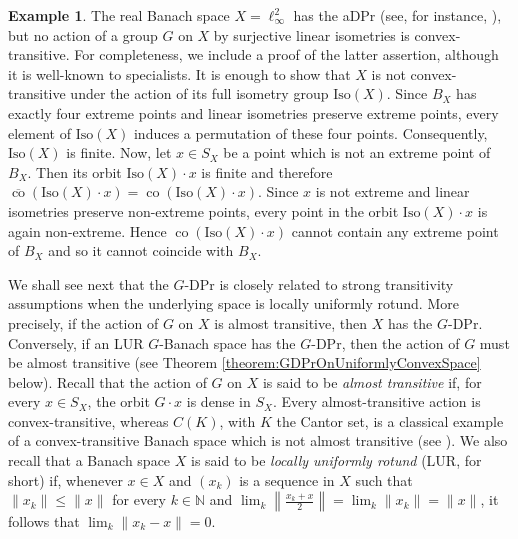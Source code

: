 \documentclass[a4paper,12pt]{amsart}
\theoremstyle{definition}
\theoremstyle{definition}
\newtheorem{example}[theorem]{Example}
\theoremstyle{remark}
\numberwithin{equation}{section}
\newcommand{\N}{\mathbb{N}}
\newcommand{\Iso}{\mathrm{Iso}}
\DeclareMathOperator{\co}{co}
\renewcommand{\leq}{\leqslant}
\newcommand{\<}{\langle}
\renewcommand{\>}{\rangle}
\begin{document}
	
	\begin{example} The real Banach space $X=\ell_\infty^2$ has the aDPr (see, for instance, \cite[Proposition 1.4.8]{KMRW}), but no action of a group $G$ on $X$ by surjective linear isometries is convex-transitive. For completeness, we include a proof of the latter assertion, although it is well-known to specialists. It is enough to show that $X$ is not convex-transitive under the action of its full isometry group $\Iso(X)$. Since $B_X$ has exactly four extreme points and linear isometries preserve extreme points, every element of $\Iso(X)$ induces a permutation of these four points. Consequently, $\Iso(X)$ is finite. Now, let $x \in S_X$ be a point which is not an extreme point of $B_X$. Then its orbit $\Iso(X)\cdot x$ is finite and therefore $\overline{\co}(\Iso(X)\cdot x)=\co(\Iso(X)\cdot x)$. Since $x$ is not extreme and linear isometries preserve non-extreme points, every point in the orbit $\Iso(X)\cdot x$ is again non-extreme. Hence $\co(\Iso(X)\cdot x)$ cannot contain any extreme point of $B_X$ and so it cannot coincide with $B_X$.
	\end{example}
	
	
	We shall see next that the $G$-DPr is closely related to strong transitivity assumptions when the underlying space is locally uniformly rotund. More precisely, if the action of $G$ on $X$ is almost transitive, then $X$ has the $G$-DPr.  Conversely, if an LUR $G$-Banach space has the $G$-DPr, then the action of $G$ must be almost transitive (see Theorem \ref{theorem:GDPrOnUniformlyConvexSpace} below). Recall that the action of $G$ on $X$ is said to be \emph{almost transitive} if, for every $x \in S_X$, the orbit $G \cdot x$ is dense in $S_X$. Every almost-transitive action is convex-transitive, whereas $C(K)$, with $K$ the Cantor set, is a classical example of a convex-transitive Banach space which is not almost transitive (see \cite{PR1962}). We also recall that a Banach space $X$ is said to be \emph{locally uniformly rotund} (LUR, for short) if, whenever $x \in X$ and $(x_k)$ is a sequence in $X$ such that $\|x_k\|\leq \|x\|$ for every $k\in\N$ and $\lim_k \left\| \frac{x_k+x}{2} \right\| = \lim_k \|x_k\| = \|x\|$, it follows that $\lim_k \|x_k-x\|=0$.
	
\end{document}
